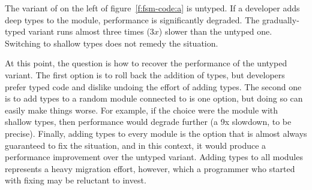 The variant of  on the left of figure~\ref{f:fsm-code:a} is untyped.
If a developer adds deep types to the  module, performance is
significantly degraded. The gradually-typed variant runs almost three times
($3x$) slower than the untyped one.  Switching to shallow types does not remedy
the situation. 


At this point, the question is how to recover the performance of the untyped
variant. The first option is to roll back the addition of types, but developers
prefer typed code and dislike undoing the effort of adding types. The second one
is to add types to a random module connected to  is one option, but
doing so can easily make things worse. For example, if the choice were the
 module with shallow types, then performance would degrade further (a
9x slowdown, to be precise). Finally, adding types to every module is the option
that is almost always guaranteed to fix the situation, and in this context, it
would produce a performance improvement over the untyped variant.  Adding types
to all modules represents a heavy migration effort, however, which a programmer
who started with fixing  may be reluctant to invest.


